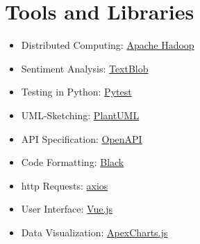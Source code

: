 \documentclass[
    fontsize=12pt,
    headings=small,
    parskip=half,           %
    bibliography=totoc,
    numbers=noenddot,       %
    open=any,               %
    ]{scrreprt}
\begin{document}
\section*{Tools and Libraries}
\begin{itemize}
    \item Distributed Computing: \href{https://hadoop.apache.org/}{Apache Hadoop}
    \item Sentiment Analysis: \href{https://hadoop.apache.org/}{TextBlob}
    \item Testing in Python: \href{https://docs.pytest.org/en/6.2.x/}{Pytest}
    \item UML-Sketching: \href{https://plantuml.com/de/}{PlantUML}
    \item API Specification: \href{https://www.openapis.org/}{OpenAPI}
    \item Code Formatting: \href{https://black.readthedocs.io/en/stable/}{Black}
    \item http Requests: \href{https://github.com/axios/axios}{axios}
    \item User Interface: \href{https://vuejs.org/}{Vue.js}
    \item Data Visualization: \href{https://apexcharts.com/}{ApexCharts.js}
    
\end{itemize}

\printbibliography
\end{document}

